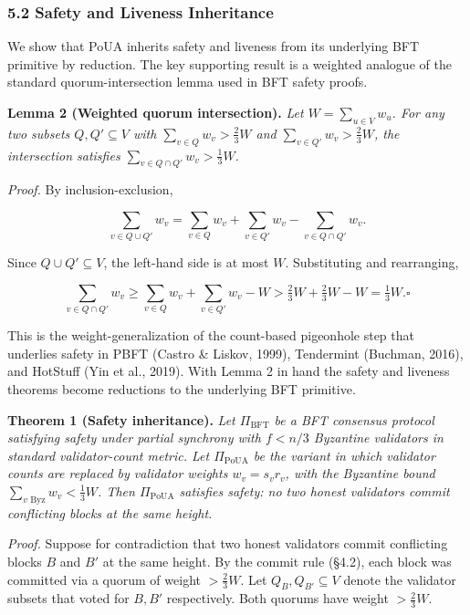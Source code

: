 \documentclass[
  11pt,
]{article}
\begin{document}
\subsubsection{5.2 Safety and Liveness
Inheritance}\label{safety-and-liveness-inheritance}

We show that PoUA inherits safety and liveness from its underlying BFT
primitive by reduction. The key supporting result is a weighted analogue
of the standard quorum-intersection lemma used in BFT safety proofs.

\textbf{Lemma 2 (Weighted quorum intersection).} \emph{Let
\(W = \sum_{u \in V} w_u\). For any two subsets \(Q, Q' \subseteq V\)
with \(\sum_{v \in Q} w_v > \frac{2}{3} W\) and
\(\sum_{v \in Q'} w_v > \frac{2}{3} W\), the intersection satisfies
\(\sum_{v \in Q \cap Q'} w_v > \frac{1}{3} W\).}

\emph{Proof.} By inclusion-exclusion,

\[\sum_{v \in Q \cup Q'} w_v = \sum_{v \in Q} w_v + \sum_{v \in Q'} w_v - \sum_{v \in Q \cap Q'} w_v.\]

Since \(Q \cup Q' \subseteq V\), the left-hand side is at most \(W\).
Substituting and rearranging,

\[\sum_{v \in Q \cap Q'} w_v \geq \sum_{v \in Q} w_v + \sum_{v \in Q'} w_v - W > \tfrac{2}{3}W + \tfrac{2}{3}W - W = \tfrac{1}{3}W. \square\]

This is the weight-generalization of the count-based pigeonhole step
that underlies safety in PBFT (Castro \& Liskov, 1999), Tendermint
(Buchman, 2016), and HotStuff (Yin et al., 2019). With Lemma 2 in hand
the safety and liveness theorems become reductions to the underlying BFT
primitive.

\textbf{Theorem 1 (Safety inheritance).} \emph{Let \(\Pi_{\text{BFT}}\)
be a BFT consensus protocol satisfying safety under partial synchrony
with \(f < n/3\) Byzantine validators in standard validator-count
metric. Let \(\Pi_{\text{PoUA}}\) be the variant in which validator
counts are replaced by validator weights \(w_v = s_v r_v\), with the
Byzantine bound \(\sum_{v \text{ Byz}} w_v < \frac{1}{3} W\). Then
\(\Pi_{\text{PoUA}}\) satisfies safety: no two honest validators commit
conflicting blocks at the same height.}

\emph{Proof.} Suppose for contradiction that two honest validators
commit conflicting blocks \(B\) and \(B'\) at the same height. By the
commit rule (§4.2), each block was committed via a quorum of weight
\(> \frac{2}{3} W\). Let \(Q_B, Q_{B'} \subseteq V\) denote the
validator subsets that voted for \(B, B'\) respectively. Both quorums
have weight \(> \frac{2}{3} W\).
\end{document}
